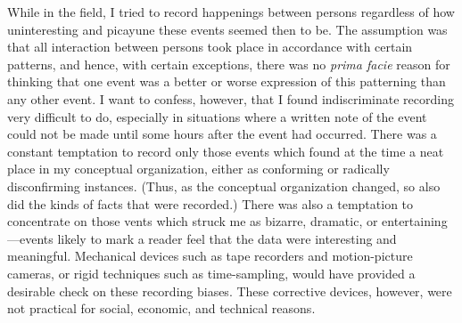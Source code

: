 \documentclass[twoside,symmetric,nobib,justified]{tufte-book}
\begin{document}
While in the field, I tried to record happenings between persons
regardless of how uninteresting and picayune these events seemed then to
be. The assumption was that all interaction between persons took place
in accordance with certain patterns, and hence, with certain exceptions,
there was no \emph{prima facie} reason for thinking that one event was a
better or worse expression of this patterning than any other event. I
want to confess, however, that I found indiscriminate recording very
difficult to do, especially in situations where a written note of the
event could not be made until some hours after the event had occurred.
There was a constant temptation to record only those events which found
at the time a neat place in my conceptual organization, either as
conforming or radically disconfirming instances. (Thus, as the
conceptual organization changed, so also did the kinds of facts that
were recorded.) There was also a temptation to concentrate on those
vents which struck me as bizarre, dramatic, or entertaining---events
likely to mark a reader feel that the data were interesting and
meaningful. Mechanical devices such as tape recorders and motion-picture
cameras, or rigid techniques such as time-sampling, would have provided
a desirable check on these recording biases. These corrective devices,
however, were not practical for social, economic, and technical reasons.
\end{document}
